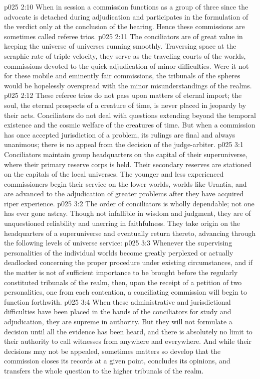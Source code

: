 \pc \vs p025 2:10 When in session a commission functions as a group of three since the advocate is detached during adjudication and participates in the formulation of the verdict only at the conclusion of the hearing. Hence these commissions are sometimes called referee trios.
\pc \vs p025 2:11 The conciliators are of great value in keeping the universe of universes running smoothly. Traversing space at the seraphic rate of triple velocity, they serve as the traveling courts of the worlds, commissions devoted to the quick adjudication of minor difficulties. Were it not for these mobile and eminently fair commissions, the tribunals of the spheres would be hopelessly overspread with the minor misunderstandings of the realms.
\vs p025 2:12 These referee trios do not pass upon matters of eternal import; the soul, the eternal prospects of a creature of time, is never placed in jeopardy by their acts. Conciliators do not deal with questions extending beyond the temporal existence and the cosmic welfare of the creatures of time. But when a commission has once accepted jurisdiction of a problem, its rulings are final and always unanimous; there is no appeal from the decision of the judge\hyp{}arbiter.
\vs p025 3:1 Conciliators maintain group headquarters on the capital of their superuniverse, where their primary reserve corps is held. Their secondary reserves are stationed on the capitals of the local universes. The younger and less experienced commissioners begin their service on the lower worlds, worlds like Urantia, and are advanced to the adjudication of greater problems after they have acquired riper experience.
\vs p025 3:2 The order of conciliators is wholly dependable; not one has ever gone astray. Though not infallible in wisdom and judgment, they are of unquestioned reliability and unerring in faithfulness. They take origin on the headquarters of a superuniverse and eventually return thereto, advancing through the following levels of universe service:
\pc \vs p025 3:3 \bibnobreakspace {} Whenever the supervising personalities of the individual worlds become greatly perplexed or actually deadlocked concerning the proper procedure under existing circumstances, and if the matter is not of sufficient importance to be brought before the regularly constituted tribunals of the realm, then, upon the receipt of a petition of two personalities, one from each contention, a conciliating commission will begin to function forthwith.
\vs p025 3:4 When these administrative and jurisdictional difficulties have been placed in the hands of the conciliators for study and adjudication, they are supreme in authority. But they will not formulate a decision until all the evidence has been heard, and there is absolutely no limit to their authority to call witnesses from anywhere and everywhere. And while their decisions may not be appealed, sometimes matters so develop that the commission closes its records at a given point, concludes its opinions, and transfers the whole question to the higher tribunals of the realm.
